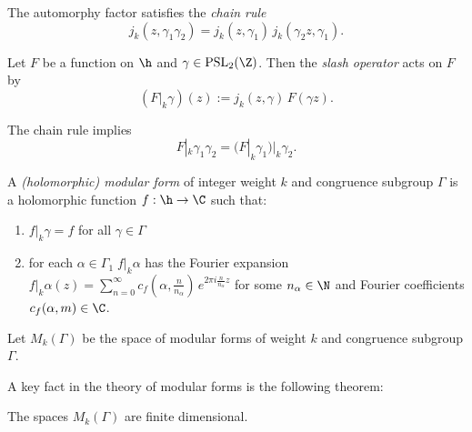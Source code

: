 \begin{lemma}\label{lemma_automorphy_factor_chain_rule}
    The automorphy factor satisfies the \emph{chain rule}
$$j_k(z,\gamma_1\gamma_2)=j_k(z,\gamma_1)\,j_k(\gamma_2z,\gamma_1). $$
\end{lemma}

\begin{definition}\label{def_slash_operator}
    Let $F$ be a  function on $\h$ and $\gamma\in\mathrm{PSL}_2(\Z)$. Then the \emph{slash operator} acts on $F$ by
$$(F|_k\gamma)(z):=j_k(z,\gamma)\,F(\gamma z). $$
\end{definition}

\begin{lemma}\label{lemma_slash_operator_chail_rule}
    The chain rule implies
$$F|_k\gamma_1\gamma_2=(F|_k\gamma_1)|_k\gamma_2.$$
\end{lemma}

\begin{definition}\label{def_holomorphic_modular_form}%
A \emph{(holomorphic) modular form} of integer weight $k$ and congruence subgroup $\Gamma$ is a holomorphic function $f:\h\to\C$ such that:
\begin{enumerate}
  \item $f|_k\gamma=f$ for all $\gamma\in\Gamma$
  \item for each $\alpha\in\Gamma_1\;f|_k\alpha$ has the Fourier expansion $f|_k\alpha (z)=\sum_{n=0}^\infty c_f(\alpha,\frac{n}{n_\alpha})\,e^{2\pi i \frac{n}{n_\alpha}z}$ for some $n_\alpha\in\N$ and Fourier coefficients $c_f(\alpha,m)\in\C$.
\end{enumerate}
\end{definition}

\begin{definition}\label{def_Mk}
    Let $M_k(\Gamma)$ be the space of modular forms of weight $k$ and congruence subgroup $\Gamma$.
\end{definition}

A key fact in the theory of modular forms is the following theorem:
\begin{theorem}\label{theorem_Mk_finite_dimensional}
    The spaces $M_k(\Gamma)$ are finite dimensional.
\end{theorem}

